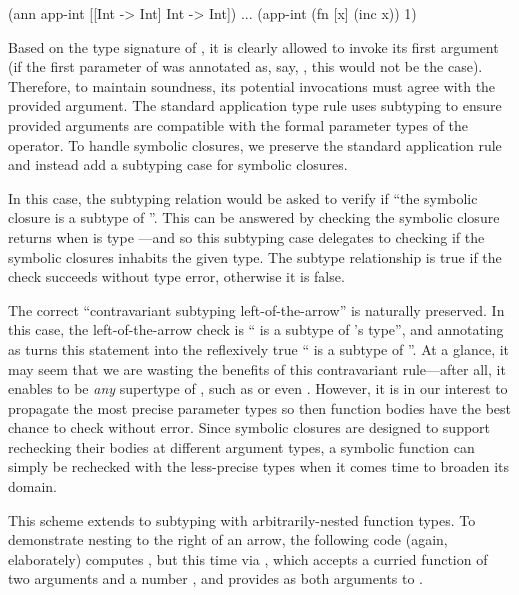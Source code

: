 \begin{cljlisting}
(ann app-int [[Int -> Int] Int -> Int])
...
(app-int (fn [x] (inc x)) 1)
\end{cljlisting}

Based on the type signature of ,
it is clearly allowed to invoke its first argument
(if the first parameter of  was annotated as, say,
, this would not be the case).
Therefore, to maintain soundness, its potential invocations must
agree with the provided argument.
The standard application type rule uses subtyping to ensure
provided arguments are compatible with the formal parameter types of
the operator.
To handle symbolic closures, we preserve the standard application rule
and instead add a subtyping case for symbolic closures.

In this case, the subtyping relation would be asked to verify if
``the symbolic closure 
is a subtype of ''.
This can be answered by checking the symbolic closure
returns  when 
 is type ---and so this subtyping case
delegates to checking if the symbolic closures inhabits the given type.
The subtype relationship is true if the check succeeds without type error,
otherwise it is false.

The correct ``contravariant subtyping left-of-the-arrow''
is naturally preserved.
In this case, the left-of-the-arrow check is `` is a subtype of 's type'', and
annotating  as  turns this statement into the reflexively true `` is a subtype of ''.
At a glance, it may seem that we are wasting the benefits
of this contravariant rule---after all, it enables  to be \emph{any} supertype of
, such as  or even .
However, it is in our interest to propagate the most precise parameter types
so then function bodies have the best chance to check without error.
Since symbolic closures are designed to support rechecking their bodies at different argument types,
a symbolic function can simply be rechecked with the less-precise types
when it comes time to broaden its domain.

This scheme extends to subtyping with arbitrarily-nested function types.
To demonstrate nesting to the right of an arrow,
the following code (again, elaborately) computes ,
but this time
via , which accepts a curried
function of two arguments  and a number , and 
provides  as both arguments to .

